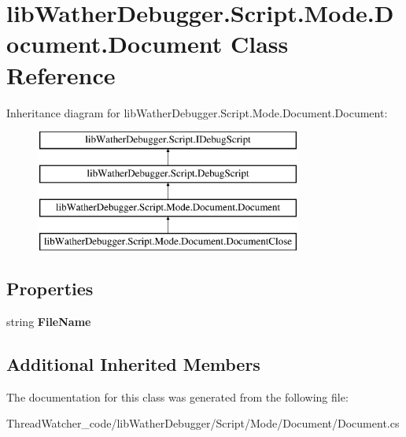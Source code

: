 \hypertarget{classlib_wather_debugger_1_1_script_1_1_mode_1_1_document_1_1_document}{\section{lib\+Wather\+Debugger.\+Script.\+Mode.\+Document.\+Document Class Reference}
\label{classlib_wather_debugger_1_1_script_1_1_mode_1_1_document_1_1_document}
}
Inheritance diagram for lib\+Wather\+Debugger.\+Script.\+Mode.\+Document.\+Document\+:\begin{figure}[H]
\begin{center}
\leavevmode
\includegraphics[height=4.000000cm]{classlib_wather_debugger_1_1_script_1_1_mode_1_1_document_1_1_document}
\end{center}
\end{figure}
\subsection*{Properties}
\begin{DoxyCompactItemize}
\item 
\hypertarget{classlib_wather_debugger_1_1_script_1_1_mode_1_1_document_1_1_document_ab4e7ddec78bccaef0c47026ad3feae1f}{string {\bfseries File\+Name}}\label{classlib_wather_debugger_1_1_script_1_1_mode_1_1_document_1_1_document_ab4e7ddec78bccaef0c47026ad3feae1f}

\end{DoxyCompactItemize}
\subsection*{Additional Inherited Members}


The documentation for this class was generated from the following file\+:\begin{DoxyCompactItemize}
\item 
Thread\+Watcher\+\_\+code/lib\+Wather\+Debugger/\+Script/\+Mode/\+Document/Document.\+cs\end{DoxyCompactItemize}
